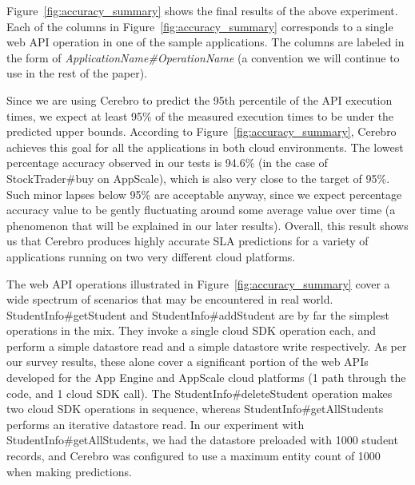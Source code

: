 Figure~\ref{fig:accuracy_summary} shows the final results of the above experiment.
Each of the columns in Figure~\ref{fig:accuracy_summary} corresponds to a single web API operation in 
one of the sample applications. The columns are labeled in the form of \textit{ApplicationName\#OperationName} (a convention 
we will continue to use in the rest of the paper). %

Since we are using Cerebro to predict the 95th percentile of the API execution times, we expect at least 95\% of the measured execution
times to be under the predicted upper bounds. According to Figure~\ref{fig:accuracy_summary}, Cerebro achieves this goal for all
the applications in both cloud environments. The lowest percentage accuracy observed
in our tests is 94.6\% (in the case of StockTrader\#buy on AppScale), which is also very close to the target of 95\%. Such minor
lapses below 95\% are acceptable anyway, since we expect percentage accuracy value to be gently fluctuating around some
average value over time (a phenomenon that will be explained in our later results). Overall, this result shows us that
Cerebro produces highly accurate SLA predictions for a variety of applications running on two very
different cloud platforms.

The web API operations illustrated in Figure~\ref{fig:accuracy_summary} cover a wide spectrum of scenarios that may be encountered
in real world. StudentInfo\#getStudent and StudentInfo\#addStudent are by far the simplest
operations in the mix. They invoke a single cloud SDK operation each, and perform a simple datastore read and a simple
datastore write respectively. As per our survey results, these alone cover a significant portion of the 
web APIs developed for the App Engine and AppScale cloud platforms (1 path through the code, and 1 cloud SDK call). 
The StudentInfo\#deleteStudent operation makes two cloud SDK operations in sequence, whereas
StudentInfo\#getAllStudents performs an iterative datastore read.
In our experiment with StudentInfo\#getAllStudents, we had the datastore preloaded with 1000 student records, 
and Cerebro was configured to use a maximum entity count of 1000 when making predictions.

